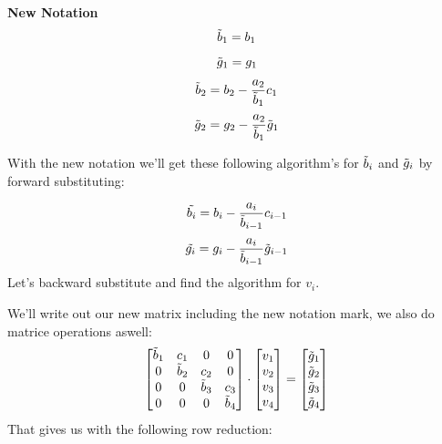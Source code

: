 \documentclass{article}
\begin{document}
\begin{tcolorbox}
\textbf{New Notation}
\begin{equation}\label{16}
    \Tilde{b}_1 = b_1 
\end{equation}
\begin{equation}\label{17}
    \Tilde{g}_1 = g_1
\end{equation}
\begin{equation}\label{18}
    \Tilde{b}_2 = b_2 - \frac{a_2}{\Tilde{b}_1}c_1 
\end{equation}
\begin{equation}\label{19}
    \Tilde{g}_2 = g_2 - \frac{a_2}{\Tilde{b}_1}\Tilde{g}_1
\end{equation}
\end{tcolorbox}
\begin{flushleft}
With the new notation we'll get these following algorithm's for $\Tilde{b}_i$ and $\Tilde{g}_i$ by forward substituting:
\end{flushleft}
\begin{equation}\label{20}
    \Tilde{b_i} = b_i - \frac{a_i}{\Tilde{b}_{i-1}}c_{i-1}
\end{equation}
\begin{equation}\label{21}
    \Tilde{g_i} = g_i - \frac{a_i}{\Tilde{b}_{i-1}}\Tilde{g}_{i-1}
\end{equation}
Let's backward substitute and find the algorithm for $v_i$.

We'll write out our new matrix including the new notation mark, we also do matrice operations aswell: 
\begin{equation*}
    \begin{bmatrix}
        \Tilde{b}_1 & c_1 & 0 & 0  \\
        0 & \Tilde{b}_2 & c_2 & 0  \\
        0 & 0 & \Tilde{b}_3 & c_3  \\
        0 & 0 & 0 & \Tilde{b}_4    \\
    \end{bmatrix}
    \cdot
    \begin{bmatrix}
            v_1 \\
            v_2 \\
            v_3 \\
            v_4 \\
    \end{bmatrix}
    =
    \begin{bmatrix}
        \Tilde{g}_1               \\
        \Tilde{g}_2               \\
        \Tilde{g}_3               \\
        \Tilde{g}_4               \\
    \end{bmatrix}
\end{equation*}
That gives us with the following row reduction:
\end{document}
